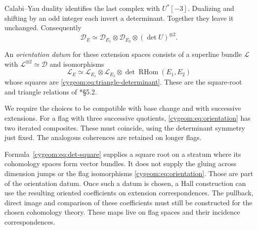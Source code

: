 Calabi--Yau duality identifies the last complex with $U^*[-3]$.
Dualizing and shifting by an odd integer each invert a determinant.
Together they leave it unchanged. Consequently
\begin{equation}\label{cygeom:eq:triangle-determinant}
 \mathcal D_E\simeq
 \mathcal D_{E_1}\otimes\mathcal D_{E_2}\otimes(\det U)^{\otimes2}.
\end{equation}

An \emph{orientation datum} for these extension spaces consists of a
superline bundle $\mathcal L$ with $\mathcal L^{\otimes2}\simeq\mathcal D$
and isomorphisms
\begin{equation}\label{cygeom:eq:orientation}
 \mathcal L_E\simeq
 \mathcal L_{E_1}\otimes\mathcal L_{E_2}\otimes
 \det\operatorname{RHom}(E_1,E_2)
\end{equation}
whose squares are \eqref{cygeom:eq:triangle-determinant}. These are the
square-root and triangle relations of
\cite{cygeom:KS-orientation}*{\S5.2}.

We require the choices to be compatible with base change and with
successive extensions. For a flag with three successive quotients,
\eqref{cygeom:eq:orientation} has two iterated composites.
These must coincide, using the determinant symmetry just fixed.
The analogous coherences are retained
on longer flags.

Formula~\eqref{cygeom:eq:det-square} supplies a square root on a stratum
where its cohomology spaces form vector bundles. It does not supply the
gluing across dimension jumps or the flag isomorphisms
\eqref{cygeom:eq:orientation}. Those are part of the orientation datum.
Once such a datum is chosen, a Hall construction can use the resulting
oriented coefficients on extension correspondences. The pullback,
direct image and comparison of these coefficients must still be
constructed for the chosen cohomology theory. These maps live on flag
spaces and their incidence correspondences.
